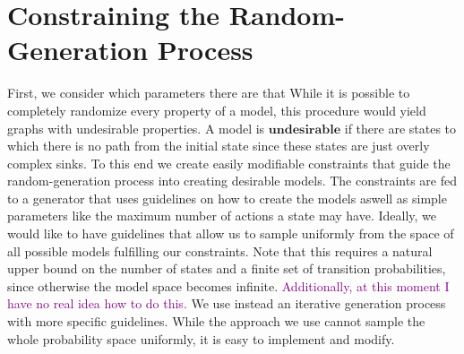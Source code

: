 
\section{Constraining the Random-Generation Process}
First, we consider which parameters there are that 
While it is possible to completely randomize every property of a model, this procedure would yield graphs with undesirable properties. A model is $\mathbf{undesirable}$ if there are states to which there is no path from the initial state since these states are just overly complex sinks. To this end we create easily modifiable constraints that guide the random-generation process into creating desirable models. The constraints are fed to a generator that uses guidelines on how to create the models aswell as simple parameters like the maximum number of actions a state may have.
Ideally, we would like to have guidelines that allow us to sample uniformly from the space of all possible models fulfilling our constraints. Note that this requires a natural upper bound on the number of states and a finite set of transition probabilities, since otherwise the model space becomes infinite. \textcolor{purple}{Additionally, at this moment I have no real idea how to do this.}
We use instead an iterative generation process with more specific guidelines. While the approach we use cannot sample the whole probability space uniformly, it is easy to implement and modify.


